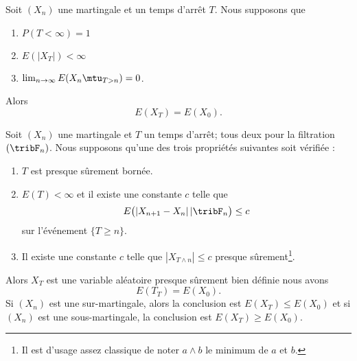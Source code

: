 \begin{theorem}   
    Soit \( (X_n)\) une martingale et un temps d'arrêt \( T\). Nous supposons que 
    \begin{enumerate}
        \item
            \( P(T<\infty)=1\)
        \item
            \( E(| X_T |)<\infty\)
        \item
            \( \lim_{n\to \infty} E(X_n\mtu_{T>n})=0\).
    \end{enumerate}
    Alors
    \begin{equation}
        E(X_T)=E(X_0).
    \end{equation}
\end{theorem}

\begin{theorem} \label{ThoZTrdjtZ}
    Soit \( (X_n)\) une martingale et \( T\) un temps d'arrêt; tous deux pour la filtration \( (\tribF_n)\). Nous supposons qu'une des trois propriétés suivantes soit vérifiée :
    \begin{enumerate}
        \item
            \( T\) est presque sûrement bornée.
        \item
            \( E(T)<\infty\) et il existe une constante \( c\) telle que
            \begin{equation}
                E\big( | X_{n+1}-X_n |\,|\tribF_n \big)\leq c
            \end{equation}
            sur l'événement \( \{ T\geq n \}\).
        \item   \label{ItemQVWZuBkiii}
            Il existe une constante \( c\) telle que \( | X_{T\wedge n} |\leq c\) presque sûrement\footnote{Il est d'usage assez classique de noter \( a\wedge b\) le minimum de \( a\) et \( b\).}.
    \end{enumerate}
    Alors \( X_T\) est une variable aléatoire presque sûrement bien définie nous avons
    \begin{equation}
        E(T_T)=E(X_0).
    \end{equation}
    Si \( (X_n)\) est une sur-martingale, alors la conclusion est \( E(X_T)\leq E(X_0)\) et si \( (X_n)\) est une sous-martingale, la conclusion est \( E(X_T)\geq E(X_0)\).
\end{theorem}

